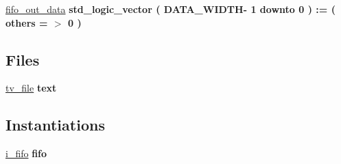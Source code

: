 \begin{DoxyCompactItemize}
\item 
\hyperlink{classfifo__tb_1_1arch__sim__tb__top_ab2d0f67ea54f26118afbc1308083d9be}{fifo\+\_\+out\+\_\+data} {\bfseries \textcolor{comment}{std\+\_\+logic\+\_\+vector}\textcolor{vhdlchar}{ }\textcolor{vhdlchar}{(}\textcolor{vhdlchar}{ }\textcolor{vhdlchar}{ }\textcolor{vhdlchar}{ }\textcolor{vhdlchar}{ }\textcolor{vhdlchar}{D\+A\+T\+A\+\_\+\+W\+I\+D\+TH}\textcolor{vhdlchar}{-\/}\textcolor{vhdlchar}{ } \textcolor{vhdldigit}{1} \textcolor{vhdlchar}{ }\textcolor{keywordflow}{downto}\textcolor{vhdlchar}{ }\textcolor{vhdlchar}{ } \textcolor{vhdldigit}{0} \textcolor{vhdlchar}{ }\textcolor{vhdlchar}{)}\textcolor{vhdlchar}{ }\textcolor{vhdlchar}{ }\textcolor{vhdlchar}{ }\textcolor{vhdlchar}{\+:}\textcolor{vhdlchar}{=}\textcolor{vhdlchar}{ }\textcolor{vhdlchar}{(}\textcolor{vhdlchar}{ }\textcolor{vhdlchar}{ }\textcolor{keywordflow}{others}\textcolor{vhdlchar}{ }\textcolor{vhdlchar}{ }\textcolor{vhdlchar}{=}\textcolor{vhdlchar}{ }\textcolor{vhdlchar}{$>$}\textcolor{vhdlchar}{ }\textcolor{vhdlchar}{\textquotesingle{}}\textcolor{vhdlchar}{ } \textcolor{vhdldigit}{0} \textcolor{vhdlchar}{ }\textcolor{vhdlchar}{\textquotesingle{}}\textcolor{vhdlchar}{ }\textcolor{vhdlchar}{)}\textcolor{vhdlchar}{ }} \hypertarget{classfifo__tb_1_1arch__sim__tb__top_ab2d0f67ea54f26118afbc1308083d9be}{}\label{classfifo__tb_1_1arch__sim__tb__top_ab2d0f67ea54f26118afbc1308083d9be}

\end{DoxyCompactItemize}
\subsection*{Files}
 \begin{DoxyCompactItemize}
\item 
\hyperlink{classfifo__tb_1_1arch__sim__tb__top_ae768b3d4ad39e273ad558b88db04b283}{tv\+\_\+file} {\bfseries \textcolor{vhdlchar}{text}\textcolor{vhdlchar}{ }} \hypertarget{classfifo__tb_1_1arch__sim__tb__top_ae768b3d4ad39e273ad558b88db04b283}{}\label{classfifo__tb_1_1arch__sim__tb__top_ae768b3d4ad39e273ad558b88db04b283}

\end{DoxyCompactItemize}
\subsection*{Instantiations}
 \begin{DoxyCompactItemize}
\item 
\hyperlink{classfifo__tb_1_1arch__sim__tb__top_a47b01e50faceb121d8aee3322ca3742c}{i\+\_\+fifo}  {\bfseries fifo}   \hypertarget{classfifo__tb_1_1arch__sim__tb__top_a47b01e50faceb121d8aee3322ca3742c}{}\label{classfifo__tb_1_1arch__sim__tb__top_a47b01e50faceb121d8aee3322ca3742c}

\end{DoxyCompactItemize}


